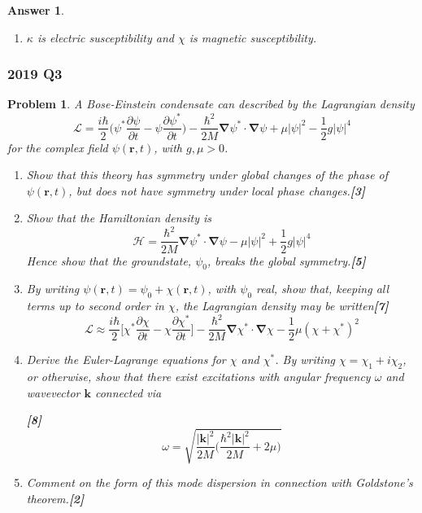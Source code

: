 \documentclass[a4paper]{article}
\newtheorem{ans}{Answer}[section]
\theoremstyle{new}
\newtheorem{qns}{Problem}[section]
\begin{document}
\begin{ans}
\begin{enumerate}[label=(\alph*)]
\begin{align}
\end{align}
where the diagonal entries of $M$ are zero since $M$ is anti-symmetric, and lowering the zero index via $g_{00}$ does not incur a negative sign. When $i\neq 0$, we have
$$F_{i0}=\frac{1}{\kappa}M^{0\beta}g_{\beta i}+\frac{1}{\chi}M_{i0}+\frac{1}{\chi}M^{i0} g_{00}\implies\frac{E_i}{c}=-\frac{1}{\kappa}M^{0i}+\frac{1}{\chi}(M_{i0}-M_{i0})\implies \frac{E_i}{c}=-\kappa (-P_i)=P_i$$
where $F_{i0}=-E_i$. When $j\neq k$, 
$$F_{jk}=\frac{1}{\chi}M_{jk}\implies B_i=\frac{1}{\chi}M_i$$
where $B_i=-\frac{1}{2}\varepsilon_{ijk}F^{jk}$ and $M_i=\frac{1}{2}\varepsilon_{ijk}M^{jk}$.
\item $\kappa$ is electric susceptibility and $\chi$ is magnetic susceptibility.
\end{enumerate}
\end{ans}
\subsubsection*{2019 Q3}
\begin{qns}
A Bose-Einstein condensate can described by the Lagrangian density
$$\mathcal{L}=\frac{i\hbar}{2}\bigg(\psi^*\frac{\partial\psi}{\partial t}-\psi\frac{\partial\psi^*}{\partial t}\bigg)-\frac{\hbar^2}{2M}\boldsymbol{\nabla}\psi^*\cdot\boldsymbol{\nabla}\psi+\mu|\psi|^2-\frac{1}{2}g|\psi|^4$$
for the complex field $\psi(\mathbf{r},t)$, with $g,\mu>0$.
\begin{enumerate}[label=(\alph*)]
\item Show that this theory has symmetry under global changes of the phase of $\psi(\mathbf{r},t)$, but does not have symmetry under local phase changes.\hfill\textbf{[3]}
\item Show that the Hamiltonian density is
$$\mathcal{H}=\frac{\hbar^2}{2M}\boldsymbol{\nabla}\psi^*\cdot\boldsymbol{\nabla}\psi-\mu|\psi|^2+\frac{1}{2}g|\psi|^4$$
Hence show that the groundstate, $\psi_0$, breaks the global symmetry.\hfill\textbf{[5]}
\item By writing $\psi(\mathbf{r},t)=\psi_0+\chi(\mathbf{r},t)$, with $\psi_0$ real, show that, keeping all terms up to second order in $\chi$, the Lagrangian density may be written\hfill\textbf{[7]}
$$\mathcal{L}\approx\frac{i\hbar}{2}\bigg[\chi^*\frac{\partial\chi}{\partial t}-\chi\frac{\partial\chi^*}{\partial t}\bigg]-\frac{\hbar^2}{2M}\boldsymbol{\nabla}\chi^*\cdot\boldsymbol{\nabla}\chi-\frac{1}{2}\mu(\chi+\chi^*)^2$$
\item Derive the Euler-Lagrange equations for $\chi$ and $\chi^*$. By writing $\chi=\chi_1+i\chi_2$, or otherwise, show that there exist excitations with angular frequency $\omega$ and wavevector $\mathbf{k}$ connected via

\hfill\textbf{[8]}
$$\omega=\sqrt{\frac{|\mathbf{k}|^2}{2M}\bigg(\frac{\hbar^2|\mathbf{k}|^2}{2M}+2\mu\bigg)}$$
\item Comment on the form of this mode dispersion in connection with Goldstone’s theorem.\hfill\textbf{[2]}
\end{enumerate}
\end{qns}
\end{document}
